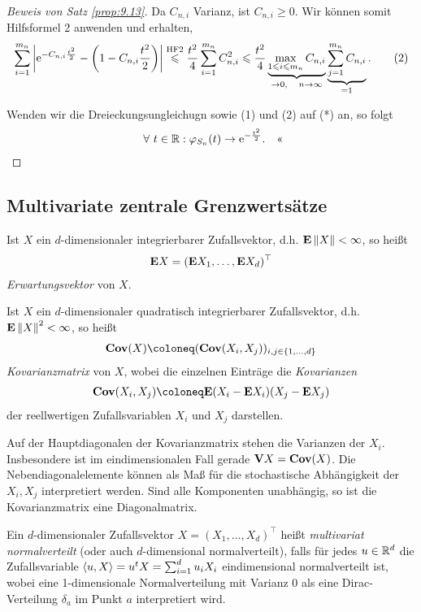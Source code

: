 \begin{proof}[Beweis von Satz \ref{prop:9.13}]
Da $C_{n,i}$ Varianz, ist $C_{n,i}\ge0$. Wir können somit
Hilfsformel 2 anwenden und erhalten,
\begin{align*}
\sum_{i=1}^{m_n}\left|\mathrm{e}^{-C_{n,i}\frac{t^2}{2}}-\left(1-C_{n,i}\frac{t^2}{2}\right)\right|
\overset{\text{HF2}}{\leqslant} \frac{t^2}{4}\sum_{i=1}^{m_n} C_{n,i}^2
\leqslant \frac{t^2}{4} \underbrace{\max\limits_{1\leqslant i\leqslant m_n}
C_{n,i}}_{\to
0,\quad n\to\infty}
\underbrace{\sum_{j=1}^{m_n} C_{n,i}}_{=1}.\tag{2}
\end{align*}

Wenden wir die Dreieckungsungleichugn sowie (1) und (2) auf (*) an, so folgt
\begin{align*}
\forall t\in \R : \ph_{S_n}(t) \to \e^{-\frac{t^2}{2}}.\qedhere
\end{align*}
\end{proof}

\subsection{Multivariate zentrale Grenzwertsätze}

Ist $X$ ein $d$-dimensionaler integrierbarer Zufallsvektor, d.h. $\textbf{E}\left\|X\right\| <
\infty$, so heißt
\begin{align*}
\textbf{E} X= (\textbf{E} X_1,\ldots,\textbf{E} X_d)^\top
\end{align*}
\emph{Erwartungsvektor} von $X$.

Ist $X$ ein $d$-dimensionaler quadratisch integrierbarer Zufallsvektor,
d.h. $\textbf{E}\left\|X\right\|^2 < \infty$, so heißt
\begin{align*}
\Cov(X)\defl (\Cov(X_i,X_j))_{i,j\in\setd{1,\ldots,d}}
\end{align*}
\emph{Kovarianzmatrix} von $X$, wobei die einzelnen Einträge die
\emph{Kovarianzen}
\begin{align*}
\Cov(X_i,X_j)\defl\E(X_i-\E X_i)(X_j-\E X_j)
\end{align*}
der reellwertigen Zufallsvariablen $X_i$ und $X_j$ darstellen.

Auf der Hauptdiagonalen der Kovarianzmatrix stehen die Varianzen der $X_i$.
Insbesondere ist im eindimensionalen Fall gerade $\textbf{V} X = \mathbf{Cov}(X)$. Die
Nebendiagonalelemente können als Maß für die stochastische Abhängigkeit der
$X_i,X_j$ interpretiert werden. Sind alle Komponenten unabhängig, so ist die
Kovarianzmatrix eine Diagonalmatrix.

\begin{defn}
\label{defn:9.2}
Ein $d$-dimensionaler Zufallsvektor
$X=(X_1,\ldots,X_d)^\top$ heißt \emph{multivariat normalverteilt} (oder auch
$d$-dimensional normalverteilt), falls für jedes $u\in\mathbb{R}^d$ die
Zufallsvariable $\left\langle u,X\right\rangle = u^tX=\sum_{i=1}^d u_iX_i$
eindimensional normalverteilt ist, wobei eine 1-dimensionale Normalverteilung
mit Varianz $0$ als eine Dirac-Verteilung $\delta_a$ im Punkt $a$
interpretiert wird.\fishhere
\end{defn}

